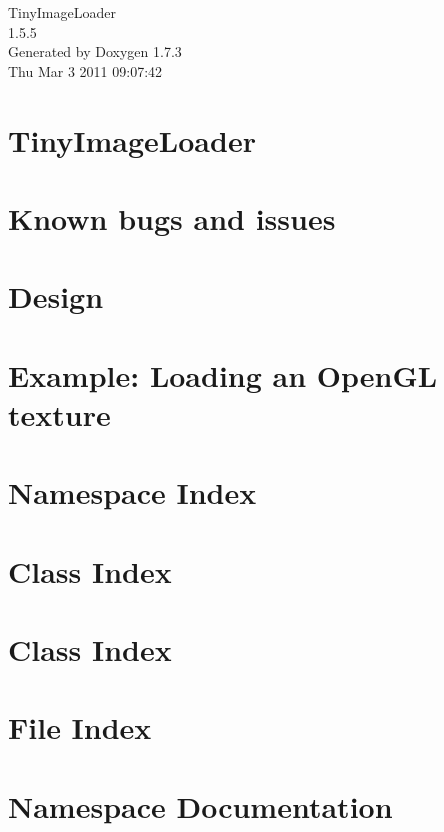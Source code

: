 \documentclass[a4paper]{book}
\begin{document}
\hypersetup{pageanchor=false}
\begin{titlepage}
\vspace*{7cm}
\begin{center}
{\Large TinyImageLoader \\[1ex]\large 1.5.5 }\\
\vspace*{1cm}
{\large Generated by Doxygen 1.7.3}\\
\vspace*{0.5cm}
{\small Thu Mar 3 2011 09:07:42}\\
\end{center}
\end{titlepage}
\clearemptydoublepage
{}
\tableofcontents
\clearemptydoublepage
{}
\hypersetup{pageanchor=true}
\chapter{TinyImageLoader}
\label{index}\hypertarget{index}{}
\chapter{Known bugs and issues}
\label{bugs}
\hypertarget{bugs}{}

\chapter{Design}
\label{design}
\hypertarget{design}{}

\chapter{Example: Loading an OpenGL texture}
\label{example1}
\hypertarget{example1}{}

\chapter{Namespace Index}

\chapter{Class Index}

\chapter{Class Index}

\chapter{File Index}

\chapter{Namespace Documentation}


\end{document}
